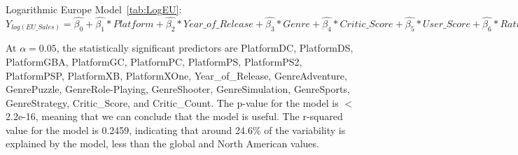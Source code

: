 \documentclass[12pt]{article}
\begin{document}
\begin{table}[ht]
\end{table}



Logarithmic Europe Model~\ref{tab:LogEU}:
$Y_{log(EU\_Sales)}=\hat{\beta_{0}}+\hat{\beta_{1}}*Platform+\hat{\beta_{2}}*Year\_of\_Release+\hat{\beta_{3}}*Genre+\hat{\beta_{4}}*Critic\_Score+\hat{\beta_{5}}*User\_Score+\hat{\beta_{6}}*Rating+\hat{\beta_{7}}*Critic\_Count+\hat{\beta_{8}}*Critic\_Count$

At $\alpha=0.05$, the statistically significant predictors are PlatformDC, PlatformDS, PlatformGBA, PlatformGC, PlatformPC, PlatformPS, 
PlatformPS2, PlatformPSP, PlatformXB, PlatformXOne, Year\_of\_Release, GenreAdventure, GenrePuzzle, GenreRole-Playing, GenreShooter, 
GenreSimulation, GenreSports, GenreStrategy, Critic\_Score, and Critic\_Count.  
The p-value for the model is $<$ 2.2e-16, meaning that we can conclude that the model is useful. The r-squared value for the model is 0.2459,
indicating that around 24.6\% of the variability is explained by the model, less than the global and North American values.
\end{document}
